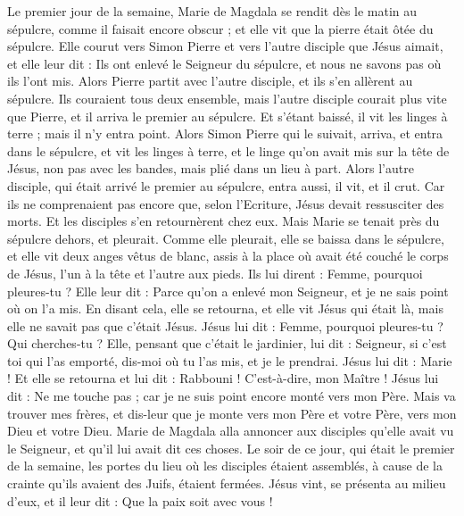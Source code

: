 \begin{multicols}{2}
\VerseOne{}Le premier jour de la semaine, Marie de Magdala se rendit dès le matin au sépulcre, comme il faisait encore obscur ; et elle vit que la pierre était ôtée du sépulcre.
Elle courut vers Simon Pierre et vers l'autre disciple que Jésus aimait, et elle leur dit : Ils ont enlevé le Seigneur du sépulcre, et nous ne savons pas où ils l'ont mis.
Alors Pierre partit avec l'autre disciple, et ils s'en allèrent au sépulcre.
Ils couraient tous deux ensemble, mais l'autre disciple courait plus vite que Pierre, et il arriva le premier au sépulcre.
Et s'étant baissé, il vit les linges à terre ; mais il n'y entra point.
Alors Simon Pierre qui le suivait, arriva, et entra dans le sépulcre, et vit les linges à terre,
et le linge qu'on avait mis sur la tête de Jésus, non pas avec les bandes, mais plié dans un lieu à part.
Alors l'autre disciple, qui était arrivé le premier au sépulcre, entra aussi, il vit, et il crut.
Car ils ne comprenaient pas encore que, selon l'Ecriture, Jésus devait ressusciter des morts.
Et les disciples s'en retournèrent chez eux.
Mais Marie se tenait près du sépulcre dehors, et pleurait. Comme elle pleurait, elle se baissa dans le sépulcre,
et elle vit deux anges vêtus de blanc, assis à la place où avait été couché le corps de Jésus, l'un à la tête et l'autre aux pieds.
Ils lui dirent : Femme, pourquoi pleures-tu ? Elle leur dit : Parce qu'on a enlevé mon Seigneur, et je ne sais point où on l'a mis.
En disant cela, elle se retourna, et elle vit Jésus qui était là, mais elle ne savait pas que c'était Jésus.
Jésus lui dit : Femme, pourquoi pleures-tu ? Qui cherches-tu ? Elle, pensant que c'était le jardinier, lui dit : Seigneur, si c'est toi qui l'as emporté, dis-moi où tu l'as mis, et je le prendrai.
Jésus lui dit : Marie ! Et elle se retourna et lui dit : Rabbouni ! C'est-à-dire, mon Maître !
Jésus lui dit : Ne me touche pas ; car je ne suis point encore monté vers mon Père. Mais va trouver mes frères, et dis-leur que je monte vers mon Père et votre Père, vers mon Dieu et votre Dieu.
Marie de Magdala alla annoncer aux disciples qu'elle avait vu le Seigneur, et qu'il lui avait dit ces choses.
Le soir de ce jour, qui était le premier de la semaine, les portes du lieu où les disciples étaient assemblés, à cause de la crainte qu'ils avaient des Juifs, étaient fermées. Jésus vint, se présenta au milieu d'eux, et il leur dit : Que la paix soit avec vous !

\end{multicols}
